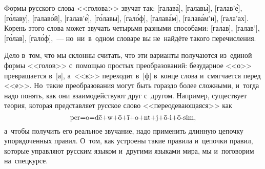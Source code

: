 



Формы русского слова <<голова>> звучат так:
[галав\'{а}], [галав\'{ы}], [галав’\'{е}], [г\'{о}лаву], [галав\'{о}й], [галав’\'{е}],
[г\'{о}лавы], [гал\'{о}ф], [галав\'{а}м], [галав\'{а}м'и], [гала'{а}х].
Корень этого слова может звучать четырьмя разными способами:
[галав], [галав’], [г\'{о}лав], [гал\'{о}ф],~---
но~ни~в~одном словаре вы не~найдёте такого перечисления.

Дело в~том, что мы склонны считать, что эти варианты получаются из~единой формы
<<голов>> с~помощью простых преобразований:
безударное <<о>> превращается в~[а], а~<<в>> переходит в~[ф] в~конце слова
и~смягчается перед <<е>>.
Но~такие преобразования могут быть гораздо более сложными, и~тогда надо понять,
как они взаимодействуют друг с~другом.
Например, существует теория, которая представляет русское слово
<<переодевающаяся>> как
\[ \text{per=o=d\={e}+w+\={o}+\={\i}+o+nt+j+\={o}-i+\={o}-sim}, \]
а~чтобы получить его реальное звучание, надо применить длинную цепочку
упорядоченных правил.
О~том, как устроены такие правила и~цепочки правил, которые управляют русским
языком и~другими языками мира, мы и~поговорим на~спецкурсе.

